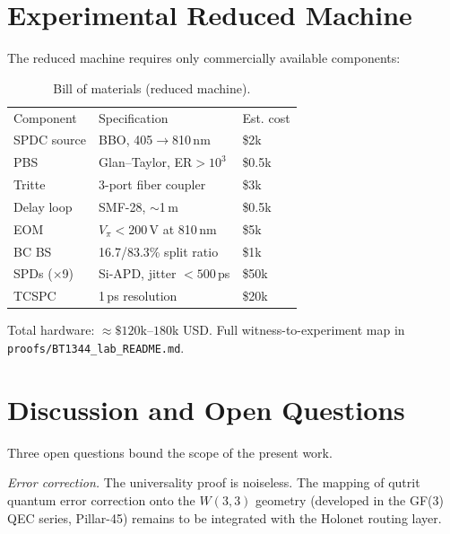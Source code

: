 \documentclass[prl,twocolumn,showpacs,superscriptaddress,longbibliography]{revtex4-2}
\begin{document}
\section{Experimental Reduced Machine}\label{sec:experiment}

The reduced machine requires only commercially available components:

\begin{table}[h]
\caption{\label{tab:bom}Bill of materials (reduced machine).}
\begin{ruledtabular}
\begin{tabular}{lll}
\textrm{Component} & \textrm{Specification} & \textrm{Est. cost}\\
\colrule
SPDC source & BBO, 405$\to$810\,nm & \$2k\\
PBS & Glan--Taylor, ER$>10^3$ & \$0.5k\\
Tritte & 3-port fiber coupler & \$3k\\
Delay loop & SMF-28, $\sim$1\,m & \$0.5k\\
EOM & $V_\pi<200$\,V at 810\,nm & \$5k\\
BC BS & 16.7/83.3\% split ratio & \$1k\\
SPDs ($\times$9) & Si-APD, jitter $<500$\,ps & \$50k\\
TCSPC & 1\,ps resolution & \$20k\\
\end{tabular}
\end{ruledtabular}
\end{table}

\noindent
Total hardware: $\approx\$120$k--$180$k USD.
Full witness-to-experiment map in \texttt{proofs/BT1344\_lab\_README.md}.

\section{Discussion and Open Questions}

Three open questions bound the scope of the present work.

\emph{Error correction.}
The universality proof is noiseless.
The mapping of qutrit quantum error correction onto the
$W(3,3)$ geometry (developed in the GF(3) QEC series,
Pillar-45) remains to be integrated with the Holonet routing layer.
\end{document}
